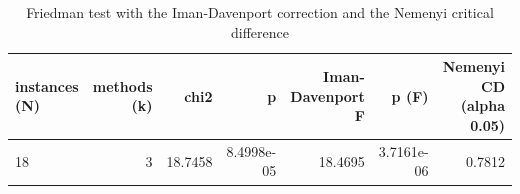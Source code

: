 \begin{table}[htbp]
\centering
\small
\caption{Friedman test with the Iman-Davenport correction and the Nemenyi critical difference}
\label{tab:E7_gurobi_threads_b10_friedman_test}
\begin{tabular}{lrrrrrr}
\toprule
instances (N) & methods (k) & chi2 & p & Iman-Davenport F & p (F) & Nemenyi CD (alpha 0.05) \\
\midrule
18 & 3 & 18.7458 & 8.4998e-05 & 18.4695 & 3.7161e-06 & 0.7812 \\
\bottomrule
\end{tabular}
\end{table}
